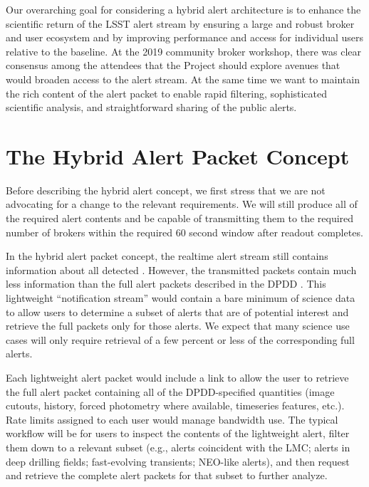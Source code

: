 \documentclass[DM,authoryear,toc]{lsstdoc}
\begin{document}
Our overarching goal for considering a hybrid alert architecture is to enhance the scientific return of the LSST alert stream by ensuring a large and robust broker and user ecosystem and by improving performance and access for individual users relative to the baseline.
At the 2019 community broker workshop, there was clear consensus among the attendees that the Project should explore avenues that would broaden access to the alert stream.
At the same time we want to maintain the rich content of the alert packet to enable rapid filtering, sophisticated scientific analysis, and straightforward sharing of the public alerts.


\section{The Hybrid Alert Packet Concept}

Before describing the hybrid alert concept, we first stress that we are not advocating for a change to the relevant requirements. \nocite{LSE-61,LSE-29}
We will still produce all of the required alert contents and be capable of transmitting them to the required number of brokers within the required 60 second window after readout completes.

In the hybrid alert packet concept, the realtime alert stream still contains information about all detected \DIASources.
However, the transmitted packets contain much less information than the full alert packets described in the DPDD .
This lightweight ``notification stream'' would contain a bare minimum of science data to allow users to determine a subset of alerts that are of potential interest and retrieve the full packets only for those alerts.
We expect that many science use cases will only require retrieval of a few percent or less of the corresponding full alerts.

Each lightweight alert packet would include a link to allow the user to retrieve the full alert packet containing all of the DPDD-specified quantities (image cutouts, \DIASource history, forced photometry where available, timeseries features, etc.).
Rate limits assigned to each user would manage bandwidth use.
The typical workflow will be for users to inspect the contents of the lightweight alert, filter them down to a relevant subset (e.g., alerts coincident with the LMC; alerts in deep drilling fields; fast-evolving transients; NEO-like alerts), and then request and retrieve the complete alert packets for that subset to further analyze.
\end{document}
